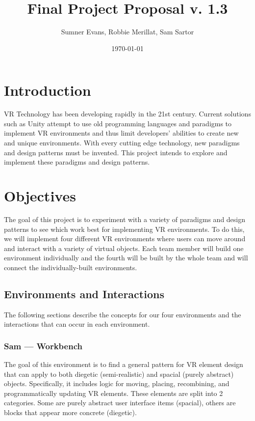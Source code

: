 \documentclass[titlepage,12pt]{article}
\title{Final Project Proposal v. 1.3}
\author{Sumner Evans, Robbie Merillat, Sam Sartor}
\date{\today}
\begin{document}
\maketitle

\section{Introduction} 

VR Technology has been developing rapidly in the 21st century. Current solutions
such as Unity attempt to use old programming languages and paradigms to
implement VR environments and thus limit developers' abilities to create new and
unique environments. With every cutting edge technology, new paradigms and
design patterns must be invented. This project intends to explore and implement
these paradigms and design patterns.

\section{Objectives}

The goal of this project is to experiment with a variety of paradigms and design
patterns to see which work best for implementing VR environments. To do this, we
will implement four different VR environments where users can move around and
interact with a variety of virtual objects. Each team member will build one
environment individually and the fourth will be built by the whole team and will
connect the individually-built environments.

\subsection{Environments and Interactions}
The following sections describe the concepts for our four environments and the
interactions that can occur in each environment.


\subsubsection{Sam --- Workbench} The goal of this environment is to find a
general pattern for VR element design that can apply to both diegetic
(semi-realistic) and spacial (purely abstract) objects. Specifically, it
includes logic for moving, placing, recombining, and programmatically updating
VR elements. These elements are split into 2 categories. Some are purely
abstract user interface items (spacial), others are blocks that appear more
concrete (diegetic).
\end{document}
